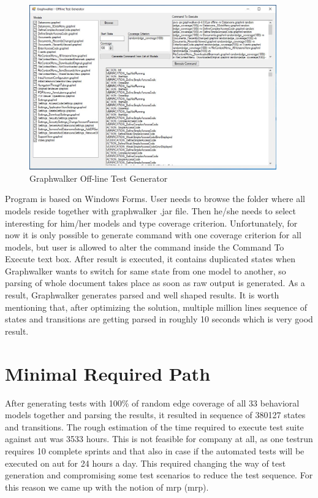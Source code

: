\begin{figure} [htbp!]
	\centering
					\includegraphics[width=0.95\textwidth]{figures/Graphwalker_GUI_screenshot}
					\caption{\label{Fig:Graphwalker_GUi} Graphwalker Off-line Test Generator}
\end{figure}

\par
Program is based on Windows Forms. User needs to browse the folder where all models reside together with graphwalker .jar file. Then he/she needs to select interesting for him/her models and type coverage criterion. Unfortunately, for now it is only possible to generate command with one coverage criterion for all models, but user is allowed to alter the command inside the Command To Execute text box. After result is executed, it contains duplicated states when Graphwalker wants to switch for same state from one model to another, so parsing of whole document takes place as soon as raw output is generated. As a result, Graphwalker generates parsed and well shaped results. It is worth mentioning that, after optimizing the solution, multiple million lines sequence of states and transitions are getting parsed in roughly 10 seconds which is very good result.

\section{Minimal Required Path}
\par
After generating tests with 100\% of random edge coverage of all 33 behavioral models together and parsing the results, it resulted in sequence of 380127 states and transitions. The rough estimation of the time required to execute test suite against \acrshort{aut} was 3533 hours. This is not feasible for company at all, as one testrun requires 10 complete sprints and that also in case if the automated tests will be executed on \acrshort{aut} for 24 hours a day. This required changing the way of test generation and compromising some test scenarios to reduce the test sequence. For this reason we came up with the notion of \acrlong{mrp} (\acrshort{mrp}).

